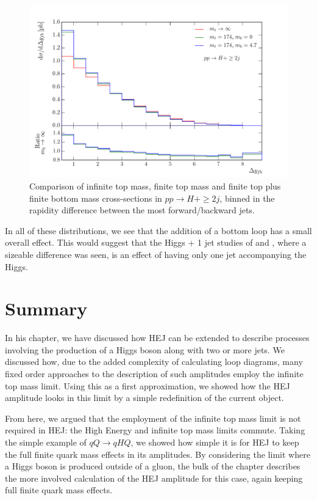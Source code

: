 \begin{figure}[t]
\centering
\includegraphics[scale=0.64]{Images/Higgs_Plots/dyfb_compare_all.pdf}
\caption{Comparison of infinite top mass, finite top mass and finite top plus finite bottom mass cross-sections in $pp \to H+\geq2j$, binned in the rapidity difference between the most forward/backward jets.}
\label{fig:hjj_dy}
\end{figure}

In all of these distributions, we see that the addition of a bottom loop has a small overall effect. This would suggest that the Higgs + 1 jet studies of \cite{Lindert2017} and \cite{Grazzini2013}, where a sizeable difference was seen, is an effect of having only one jet accompanying the Higgs. 

\section{Summary}
In his chapter, we have discussed how HEJ can be extended to describe processes involving the production of a Higgs boson along with two or more jets. We discussed how, due to the added complexity of calculating loop diagrams, many fixed order approaches to the description of such amplitudes employ the infinite top mass limit. Using this as a first approximation, we showed how the HEJ amplitude looks in this limit by a simple redefinition of the current object. 

From here, we argued that the employment of the infinite top mass limit is not required in HEJ: the High Energy and infinite top mass limits commute. Taking the simple example of $qQ \to qHQ$, we showed how simple it is for HEJ to keep the full finite quark mass effects in its amplitudes. By considering the limit where a Higgs boson is produced outside of a gluon, the bulk of the chapter describes the more involved calculation of the HEJ amplitude for this case, again keeping full finite quark mass effects. 


